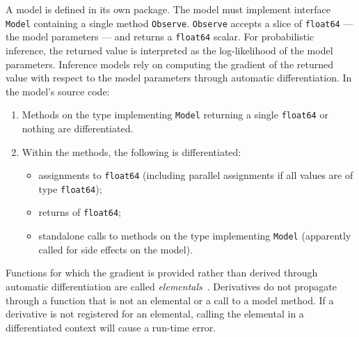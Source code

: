 \documentclass[sigplan,10pt,screen]{acmart}
\begin{document}
\begin{sloppypar}
A model is defined in its own package. The model must
implement interface \lstinline{Model} containing a single method
\lstinline{Observe}. \lstinline{Observe} accepts a slice of
\lstinline{float64} --- the model parameters --- and returns a
\lstinline{float64} scalar. For probabilistic inference, the
returned value is interpreted as the log-likelihood of the model
parameters. Inference models rely on computing the gradient of
the returned value with respect to the model parameters through
automatic differentiation. In the model's source code:

\begin{enumerate}
  \item Methods on the type implementing \lstinline{Model} returning a
    single \lstinline{float64} or nothing are differentiated.
  \item Within the methods, the following is differentiated:
    \begin{itemize}
      \item assignments to \lstinline{float64} (including parallel
        assignments if all values are of type
        \lstinline{float64});
      \item returns of \lstinline{float64};
      \item standalone calls to methods on the type implementing
        \lstinline{Model} (apparently called for side  effects on
        the model).
    \end{itemize}
\end{enumerate}

Functions for which the gradient is provided rather than derived
through automatic differentiation are called
\textit{elementals}~\cite{GW08}. Derivatives do not propagate
through a function that is not an elemental or a call to a model
method. If a derivative is not registered for an elemental,
calling the elemental in a differentiated context will cause a
run-time error.


\end{sloppypar}
\end{document}

